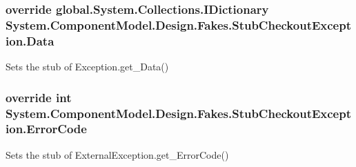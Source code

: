 \hypertarget{class_system_1_1_component_model_1_1_design_1_1_fakes_1_1_stub_checkout_exception_a269744d5dc33f056c82c44714fa6a1ac}{
\subsubsection[{Data}]{\setlength{\rightskip}{0pt plus 5cm}override global.\-System.\-Collections.\-I\-Dictionary System.\-Component\-Model.\-Design.\-Fakes.\-Stub\-Checkout\-Exception.\-Data\hspace{0.3cm}{\ttfamily [get]}}}\label{class_system_1_1_component_model_1_1_design_1_1_fakes_1_1_stub_checkout_exception_a269744d5dc33f056c82c44714fa6a1ac}


Sets the stub of Exception.\-get\-\_\-\-Data()

\hypertarget{class_system_1_1_component_model_1_1_design_1_1_fakes_1_1_stub_checkout_exception_acfad186f0b65c370e94cc2a093e8bd29}{
\subsubsection[{Error\-Code}]{\setlength{\rightskip}{0pt plus 5cm}override int System.\-Component\-Model.\-Design.\-Fakes.\-Stub\-Checkout\-Exception.\-Error\-Code\hspace{0.3cm}{\ttfamily [get]}}}\label{class_system_1_1_component_model_1_1_design_1_1_fakes_1_1_stub_checkout_exception_acfad186f0b65c370e94cc2a093e8bd29}


Sets the stub of External\-Exception.\-get\-\_\-\-Error\-Code()


